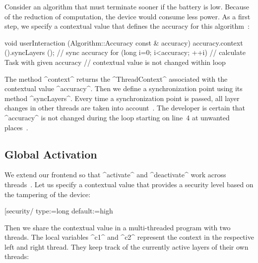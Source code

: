 \begin{example}
Consider an algorithm that must terminate sooner if the battery is low.
Because of the reduction of computation, the device would consume less power.
As a first step, we specify a contextual value that defines the accuracy for this algorithm~\cite{raab2015global}:

void userInteraction (Algorithm::Accuracy const & accuracy)
{
	accuracy.context ().syncLayers (); // sync accuracy
	for (long i=0; i<accuracy; ++i)
	{
		// calculate Task with given accuracy
		// contextual value is not changed within loop
	}
}
\end{code}

The method ^context^ returns the ^ThreadContext^ associated with the contextual value ^accuracy^.
Then we define a synchronization point using its method ^syncLayers^.
Every time a synchronization point is passed, all layer changes in other threads are taken into account~\cite{raab2015global}.
The developer is certain that ^accuracy^ is not changed during the loop starting on line~4 at unwanted places~\cite{raab2016persistent}.
\end{example}


\subsection{Global Activation}

We extend our frontend so that ^activate^ and ^deactivate^ work across threads~\cite{raab2015global}.
Let us specify a contextual value that provides a security level based on the tampering of the device:

\begin{code}
[security/%
  type:=long
  default:=high
\end{code}

Then we share the contextual value in a multi-threaded program with two threads.
The local variables ^c1^ and ^c2^ represent the context in the respective left and right thread.
They keep track of the currently active layers of their own threads:

